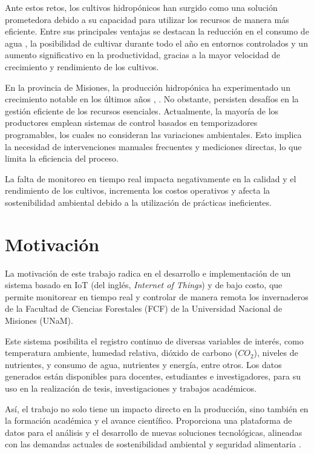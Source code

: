 Ante estos retos, los cultivos hidropónicos han surgido como una solución
prometedora debido a su capacidad para utilizar los recursos de manera más
eficiente. Entre sus principales ventajas se destacan la reducción en el
consumo de agua \cite{EficienciaAgua2014}, la posibilidad de cultivar durante
todo el año en entornos controlados y un aumento significativo en la
productividad, gracias a la mayor velocidad de crecimiento y rendimiento de los
cultivos.

En la provincia de Misiones, la producción hidropónica ha experimentado un
crecimiento notable en los últimos años \cite{HorticulturaMisiones2024},
\cite{HidroponiaMisiones2024}. No obstante, persisten desafíos en la gestión
eficiente de los recursos esenciales. Actualmente, la mayoría de los
productores emplean sistemas de control basados en temporizadores programables,
los cuales no consideran las variaciones ambientales. Esto implica la necesidad
de intervenciones manuales frecuentes y mediciones directas, lo que limita la
eficiencia del proceso.

La falta de monitoreo en tiempo real impacta negativamente en la calidad y el
rendimiento de los cultivos, incrementa los costos operativos y afecta la
sostenibilidad ambiental debido a la utilización de prácticas ineficientes.


\section{Motivación}

La motivación de este trabajo radica en el desarrollo e implementación de un
sistema basado en IoT (del inglés, \textit{Internet of Things}) y de bajo
costo, que permite monitorear en tiempo real y controlar de manera remota los
invernaderos de la Facultad de Ciencias Forestales (FCF) de la Universidad
Nacional de Misiones (UNaM).

Este sistema posibilita el registro continuo de diversas variables de interés,
como temperatura ambiente, humedad relativa, dióxido de carbono ($CO_2$),
niveles de nutrientes, y consumo de agua, nutrientes y energía, entre otros.
Los datos generados están disponibles para docentes, estudiantes e
investigadores, para su uso en la realización de tesis, investigaciones y
trabajos académicos.

Así, el trabajo no solo tiene un impacto directo en la producción, sino también
en la formación académica y el avance científico. Proporciona una plataforma de
datos para el análisis y el desarrollo de nuevas soluciones tecnológicas,
alineadas con las demandas actuales de sostenibilidad ambiental y seguridad
alimentaria \cite{seguridadAlimentariaGaribaldi2018}.

